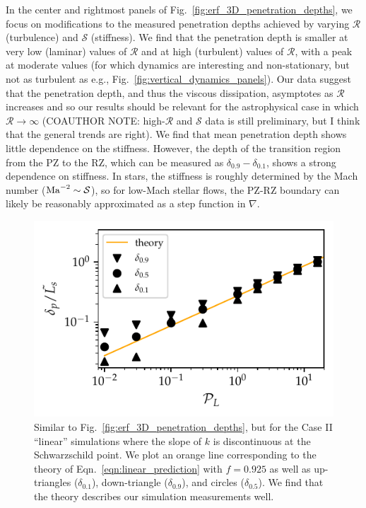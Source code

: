 \documentclass{aastex631}
\newcommand{\justgrad}{\ensuremath{\nabla}}
\newcommand{\mR}{\ensuremath{\mathcal{R}}}
\newcommand{\mS}{\ensuremath{\mathcal{S}}}
\begin{document}
In the center and rightmost panels of Fig.~\ref{fig:erf_3D_penetration_depths}, we focus on modifications to the measured penetration depths achieved by varying $\mR$ (turbulence) and $\mS$ (stiffness).
We find that the penetration depth is smaller at very low (laminar) values of $\mR$ and at high (turbulent) values of $\mR$, with a peak at moderate values (for which dynamics are interesting and non-stationary, but not as turbulent as e.g., Fig.~\ref{fig:vertical_dynamics_panels}).
Our data suggest that the penetration depth, and thus the viscous dissipation, asymptotes as $\mR$ increases and so our results should be relevant for the astrophysical case in which $\mR \rightarrow \infty$ (COAUTHOR NOTE: high-$\mR$ and $\mS$ data is still preliminary, but I think that the general trends are right).
We find that mean penetration depth shows little dependence on the stiffness.
However, the depth of the transition region from the PZ to the RZ, which can be measured as $\delta_{0.9} - \delta_{0.1}$, shows a strong dependence on stiffness.
In stars, the stiffness is roughly determined by the Mach number ($\rm{Ma}^{-2} \sim \mS$), so for low-Mach stellar flows, the PZ-RZ boundary can likely be reasonably approximated as a step function in $\justgrad$.

\begin{figure}[t!]
\centering
\includegraphics{linear_3D_penetration_depths.pdf}
\caption{
Similar to Fig.~\ref{fig:erf_3D_penetration_depths}, but for the Case II ``linear'' simulations where the slope of $k$ is discontinuous at the Schwarzschild point.
We plot an orange line corresponding to the theory of Eqn.~\ref{eqn:linear_prediction} with $f = 0.925$ as well as up-triangles ($\delta_{0.1}$), down-triangle ($\delta_{0.9}$), and circles ($\delta_{0.5}$).
We find that the theory describes our simulation measurements well.
\label{fig:linear_3D_penetration_depths}
}
\end{figure}
\end{document}
